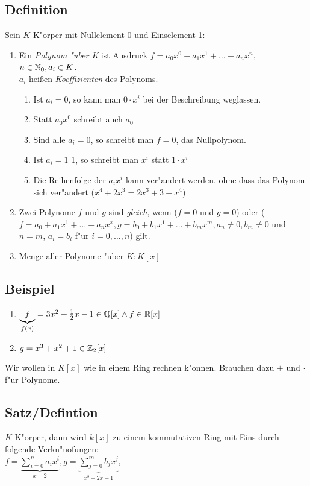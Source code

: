 \subsection{Definition}
Sein $K$ K"orper mit Nullelement $0$ und Einselement 1:
\begin{enumerate}
	\item
	Ein \emph{Polynom "uber K} ist Ausdruck $f=a_0x^0+a_1x^1+\dots + a_nx^n$, $n\in \mathbb{N}_0, a_i\in K$.\\
	$a_i$ heißen \emph{Koeffizienten} des Polynoms.
	\begin{enumerate}
		\item
		Ist $a_i=0$, so kann man $0 \cdot x^i$ bei der Beschreibung weglassen.
		\item
		Statt $a_0x^0$ schreibt auch $a_0$
		\item
		Sind alle $a_i=0$, so schreibt man $f=0$, das Nullpolynom.
		\item
		Ist $a_i =1$ 1, so schreibt man $x^i$ statt $1 \cdot x^i$
		\item
		Die Reihenfolge der $a_ix^i$ kann ver"andert werden, ohne dass das Polynom sich ver"andert ($x^4+2x^3= 2x^3 +  3 + x^4$)
	\end{enumerate} 
	\item
	Zwei Polynome $f$ und $g$ sind \emph{gleich}, wenn ($f=0$ und $g=0$) oder ($f=a_0 + a_1x^1+ \dots + a_nx^x, g=b_0+b_1x^1+ \dots + b_mx^m, a_n \neq  0, b_m \neq 0$ und $n=m$, $a_i = b_i$ f"ur $i=0, \dots , n$) gilt.
	\item
	Menge aller Polynome "uber $K: K[x]$
\end{enumerate} 

\subsection{Beispiel}
\begin{enumerate}
	\item
	$\underbrace{f}_{f(x)} = 3x^2 + \frac{1}{2}x -1 \in \mathbb{Q} [x] \land f \in \mathbb{R} [x]$
	\item
	$g= x^3 + x^2 +1 \in \mathbb{Z}_2[x] $ 
\end{enumerate}
Wir wollen in $K[x]$ wie in einem Ring rechnen k"onnen. Brauchen dazu $+$ und $\cdot$ f"ur Polynome.

\subsection{Satz/Defintion}
$K$ K"orper, dann wird $k[x]$ zu einem kommutativen Ring mit Eins durch folgende Verkn"uofungen:\\
$f= \underbrace{\sum_{i=0}^{n} a_ix^i}_{x+2}, g=\underbrace{\sum_{j=0}^{m} b_j x^j}_{x^3 + 2x + 1}$,

